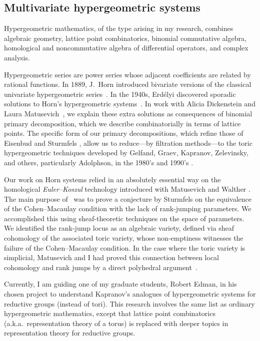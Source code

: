 \documentclass[11pt]{proposal}
\begin{document}
\subsection{Multivariate hypergeometric systems}%


Hypergeometric mathematics, of the type arising in my research,
combines algebraic geometry, lattice point combinatorics, binomial
commutative algebra, homological and noncommutative algebra of
differential operators, and complex analysis.

Hypergeometric series are power series whose adjacent coefficients are
related by rational functions.  In 1889, J.~Horn introduced bivariate
versions of the classical univariate hypergeometric
series~\cite{horn89}.  In the 1940s, Erd\'elyi discovered sporadic
solutions to Horn's hypergeometric systems~\cite{erdelyi}.  In work
with Alicia Dickenstein and Laura Matusevich~\cite{horn}, we explain
these extra solutions as consequences of binomial primary
decomposition, which we describe combinatorially in terms of lattice
points.  The specific form of our primary decompositions, which refine
those of Eisenbud and Sturmfels \cite{binomialIdeals}, allow us to
reduce---by filtration methods---to the toric hypergeometric
techniques developed by Gelfand, Graev, Kapranov, Zelevinsky, and
others, particularly Adolphson, in the 1980's and 1990's
\cite{GGZ87,GKZ89,Ado94}.

Our work on Horn systems relied in an absolutely essential way on the
homological \emph{Euler--Koszul}\/ technology introduced with
Matusevich and Walther \cite{rankJumps}.  The main purpose
of~\cite{rankJumps} was to prove a conjecture by Sturmfels on the
equivalence of the Cohen--Macaulay condition with the lack of
rank-jumping parameters.  We accomplished this using sheaf-theoretic
techniques on the space of parameters.  We identified the rank-jump
locus as an algebraic variety, defined via sheaf cohomology of the
associated toric variety, whose non-emptiness witnesses the failure of
the Cohen--Macaulay condition.  In the case where the toric variety is
simplicial, Matusevich and I had proved this connection between local
cohomology and rank jumps by a direct polyhedral
argument~\cite{simpJumps}.

Currently, I am guiding one of my graduate students, Robert Edman, in
his chosen project to understand Kapranov's analogues of
hypergeometric systems for reductive groups (instead of tori).  This
research involves the same list as ordinary hypergeometric
mathematics, except that lattice point combinatorics (a.k.a.\
representation theory of a torus) is replaced with deeper topics in
representation theory for reductive groups.
\end{document}
